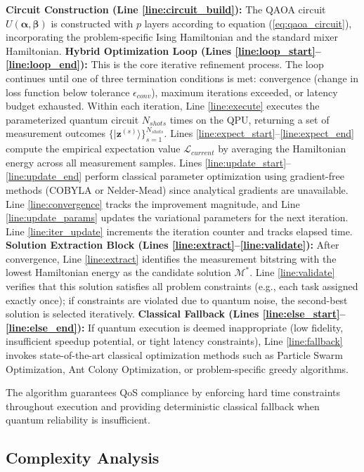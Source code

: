 \documentclass[lettersize,journal]{IEEEtran}
\begin{document}
\textbf{Circuit Construction (Line \ref{line:circuit_build}):} The QAOA circuit $U(\boldsymbol{\alpha}, \boldsymbol{\beta})$ is constructed with $p$ layers according to equation (\ref{eq:qaoa_circuit}), incorporating the problem-specific Ising Hamiltonian and the standard mixer Hamiltonian.
\textbf{Hybrid Optimization Loop (Lines \ref{line:loop_start}--\ref{line:loop_end}):} This is the core iterative refinement process. The loop continues until one of three termination conditions is met: convergence (change in loss function below tolerance $\epsilon_{conv}$), maximum iterations exceeded, or latency budget exhausted. 
Within each iteration, Line \ref{line:execute} executes the parameterized quantum circuit $N_{shots}$ times on the QPU, returning a set of measurement outcomes $\{|\mathbf{z}^{(s)}\rangle\}_{s=1}^{N_{shots}}$. Lines \ref{line:expect_start}--\ref{line:expect_end} compute the empirical expectation value $\mathcal{L}_{current}$ by averaging the Hamiltonian energy across all measurement samples. Lines \ref{line:update_start}--\ref{line:update_end} perform classical parameter optimization using gradient-free methods (COBYLA or Nelder-Mead) since analytical gradients are unavailable. Line \ref{line:convergence} tracks the improvement magnitude, and Line \ref{line:update_params} updates the variational parameters for the next iteration. Line \ref{line:iter_update} increments the iteration counter and tracks elapsed time.
\textbf{Solution Extraction Block (Lines \ref{line:extract}--\ref{line:validate}):} After convergence, Line \ref{line:extract} identifies the measurement bitstring with the lowest Hamiltonian energy as the candidate solution $\mathcal{M}^*$. Line \ref{line:validate} verifies that this solution satisfies all problem constraints (e.g., each task assigned exactly once); if constraints are violated due to quantum noise, the second-best solution is selected iteratively.
\textbf{Classical Fallback (Lines \ref{line:else_start}--\ref{line:else_end}):} If quantum execution is deemed inappropriate (low fidelity, insufficient speedup potential, or tight latency constraints), Line \ref{line:fallback} invokes state-of-the-art classical optimization methods such as Particle Swarm Optimization, Ant Colony Optimization, or problem-specific greedy algorithms.

The algorithm guarantees QoS compliance by enforcing hard time constraints throughout execution and providing deterministic classical fallback when quantum reliability is insufficient.

\subsection{Complexity Analysis}
\label{subsec:complexity}
\end{document}
